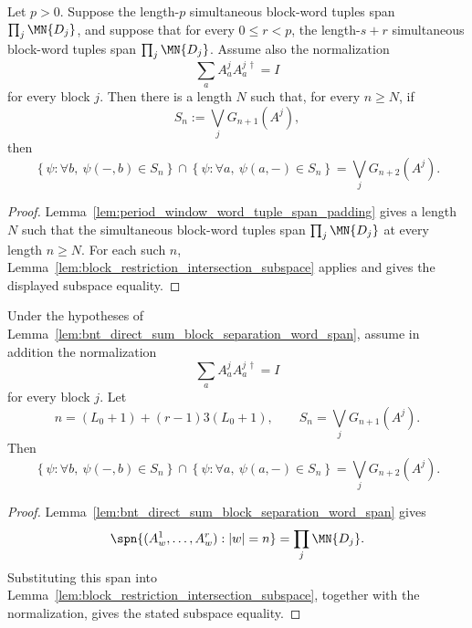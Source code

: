 \begin{lemma}
    \label{lem:period_window_block_restriction_intersection}
    \leanok
    Let $p>0$. Suppose the length-$p$ simultaneous block-word tuples span
    $\prod_j \MN{D_j}$, and suppose that for every $0\le r<p$,
    the length-$s+r$ simultaneous block-word tuples span
    $\prod_j \MN{D_j}$. Assume also the normalization
    \[
        \sum_a A^j_aA^{j\,\dagger}_a=I
    \]
    for every block $j$. Then there is a length $N$ such that, for every
    $n\ge N$, if
    \[
        S_n:=\bigvee_jG_{n+1}(A^j),
    \]
    then
    \[
        \left\{\psi:\forall b,\ \psi(-,b)\in S_n\right\}
        \cap
        \left\{\psi:\forall a,\ \psi(a,-)\in S_n\right\}
        =
        \bigvee_jG_{n+2}(A^j).
    \]
\end{lemma}

\begin{proof}
    \leanok
    Lemma~\ref{lem:period_window_word_tuple_span_padding} gives a length $N$
    such that the simultaneous block-word tuples span
    $\prod_j \MN{D_j}$ at every length $n\ge N$. For each such
    $n$, Lemma~\ref{lem:block_restriction_intersection_subspace} applies and
    gives the displayed subspace equality.
\end{proof}

\begin{lemma}
    \label{lem:bnt_direct_sum_block_separation_block_intersection}
    \leanok
    Under the hypotheses of
    Lemma~\ref{lem:bnt_direct_sum_block_separation_word_span}, assume in addition the
    normalization
    \[
        \sum_a A^j_aA^{j\,\dagger}_a=I
    \]
    for every block $j$. Let
    \[
        n=(L_0+1)+(r-1)3(L_0+1),
        \qquad
        S_n=\bigvee_jG_{n+1}(A^j).
    \]
    Then
    \[
        \left\{\psi:\forall b,\ \psi(-,b)\in S_n\right\}
        \cap
        \left\{\psi:\forall a,\ \psi(a,-)\in S_n\right\}
        =
        \bigvee_jG_{n+2}(A^j).
    \]
\end{lemma}

\begin{proof}
    \leanok
    Lemma~\ref{lem:bnt_direct_sum_block_separation_word_span} gives
    \[
        \spn\{(A^1_w,\ldots,A^r_w): |w|=n\}
        =
        \prod_j\MN{D_j}.
    \]
    Substituting this span into
    Lemma~\ref{lem:block_restriction_intersection_subspace}, together with the
    normalization, gives the stated subspace equality.
\end{proof}

